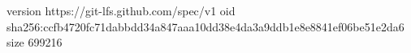 version https://git-lfs.github.com/spec/v1
oid sha256:ccfb4720fc71dabbdd34a847aaa10dd38e4da3a9ddb1e8e8841ef06be51e2da6
size 699216
